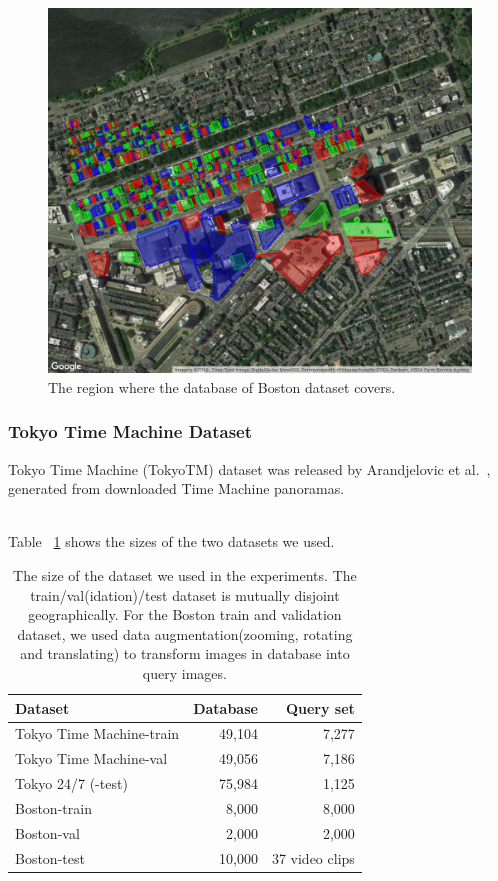 \begin{figure}[htbp]
\includegraphics[width=0.92\linewidth]{img/db_region}
\caption{The region where the database of Boston dataset covers. }
\label{fig:dbregion}
\end{figure}

\subsubsection{Tokyo Time Machine Dataset}
\par

Tokyo Time Machine (TokyoTM) dataset was released by Arandjelovic et al.~\cite{Arandjelovic16}, generated  from  downloaded  Time  Machine  panoramas. 
\\
~\par
Table ~\ref{table:netvlad} shows  the  sizes  of  the two datasets we used. 

\begin{table}[htbp]
\begin{tabular}{l|rr}
Dataset & Database & Query set \\
\hline
\hline
Tokyo Time Machine-train & 49,104 & 7,277 \\
Tokyo Time Machine-val & 49,056 & 7,186 \\
Tokyo 24/7 (-test) & 75,984 & 1,125\\
\hline
Boston-train & 8,000 & 8,000 \\
Boston-val & 2,000 & 2,000 \\
Boston-test & 10,000 & 37 video clips
\end{tabular}
\caption{The size of the dataset we used in the experiments. The train/val(idation)/test dataset is mutually disjoint geographically. For the Boston train and validation dataset, we used data augmentation(zooming, rotating and translating) to transform images in database into query images. }
\label{table:netvlad}
\end{table}


